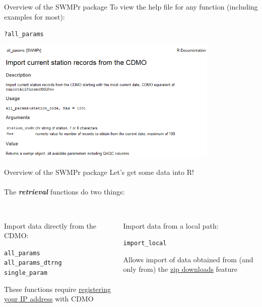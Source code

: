 \documentclass[xcolor=svgnames]{beamer}\usepackage[]{graphicx}\usepackage[]{color}
\makeatletter
\newcommand{\hlopt}[1]{\textcolor[rgb]{0,0,0}{#1}}%
\newcommand{\hlstd}[1]{\textcolor[rgb]{0.345,0.345,0.345}{#1}}%
\newenvironment{kframe}{%
 \def\at@end@of@kframe{}%
 \ifinner\ifhmode%
  \def\at@end@of@kframe{\end{minipage}}%
  \begin{minipage}{\columnwidth}%
 \fi\fi%
 \def\FrameCommand##1{\hskip\@totalleftmargin \hskip-\fboxsep
 \colorbox{shadecolor}{##1}\hskip-\fboxsep
     \hskip-\linewidth \hskip-\@totalleftmargin \hskip\columnwidth}%
 \MakeFramed {\advance\hsize-\width
   \@totalleftmargin\z@ \linewidth\hsize
   \@setminipage}}%
 {\par\unskip\endMakeFramed%
 \at@end@of@kframe}
\newenvironment{knitrout}{}{} %
\newcommand{\Bigtxt}[1]{\textbf{\textit{#1}}}
\makeatother
\begin{document}
\begin{frame}[fragile]{Overview of the SWMPr package}
To view the help file for any function (including examples for most):
\begin{knitrout}\scriptsize
{}\color{fgcolor}\begin{kframe}
\begin{alltt}
\hlopt{?}\hlstd{all_params}
\end{alltt}
\end{kframe}
\end{knitrout}
\centerline{\includegraphics[width = 0.8\textwidth]{imgs/help_ex.png}}
\end{frame}

\begin{frame}[fragile]{Overview of the SWMPr package}
Let's get some data into R!\\~\\
The \Bigtxt{retrieval} functions do two things: \\~\\
\begin{columns}[t]
\begin{column}{0.4\textwidth}
Import data directly from the CDMO:
\begin{knitrout}\scriptsize
{}\color{fgcolor}\begin{kframe}
\begin{alltt}
\hlstd{all_params}
\hlstd{all_params_dtrng}
\hlstd{single_param}
\end{alltt}
\end{kframe}
\end{knitrout}
These functions require \href{http://cdmo.baruch.sc.edu/webservices.cfm}{registering your IP address}  with CDMO
\end{column}
\begin{column}{0.4\textwidth}
Import data from a local path:
\begin{knitrout}\scriptsize
{}\color{fgcolor}\begin{kframe}
\begin{alltt}
\hlstd{import_local}
\end{alltt}
\end{kframe}
\end{knitrout}
Allows import of data obtained from (and only from) the \href{http://cdmo.baruch.sc.edu/aqs/zips.cfm}{zip downloads} feature
\end{column}
\end{columns}
\end{frame}
\end{document}
